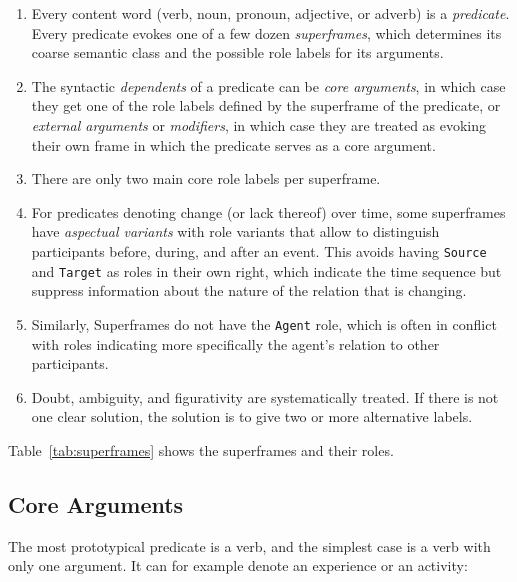 \documentclass[a4paper]{article}
\begin{document}
\begin{enumerate}
    \item Every content word (verb, noun, pronoun, adjective, or adverb) is a
        \emph{predicate}. Every predicate evokes one of a few dozen
        \emph{superframes}, which determines its coarse semantic class and the
        possible role labels for its arguments.
    \item The syntactic \emph{dependents} of a predicate can be
        \emph{core arguments}, in which case they get one of the role labels
        defined by the superframe of the predicate, or \emph{external
        arguments} or \emph{modifiers}, in which case they are treated as
        evoking their own frame in which the predicate serves as a core argument.
    \item There are only two main core role labels per superframe.
    \item For predicates denoting change (or lack thereof) over time,
        some superframes have \emph{aspectual variants} with role variants that
        allow to distinguish participants before, during, and after an event.
        This avoids having \texttt{Source} and \texttt{Target} as roles in
        their own right, which indicate the time sequence but suppress
        information about the nature of the relation that is changing.
    \item Similarly, Superframes do not have the \texttt{Agent} role, which is
        often in conflict with roles indicating more specifically the agent's
        relation to other participants.
    \item Doubt, ambiguity, and figurativity are systematically treated. If there
        is not one clear solution, the solution is to give two or more
        alternative labels.
\end{enumerate}

Table~\ref{tab:superframes} shows the superframes and their roles.

\subsection{Core Arguments}

The most prototypical predicate is a verb, and the simplest case is a verb with only one argument. It can for example denote an experience or an activity:
\end{document}
